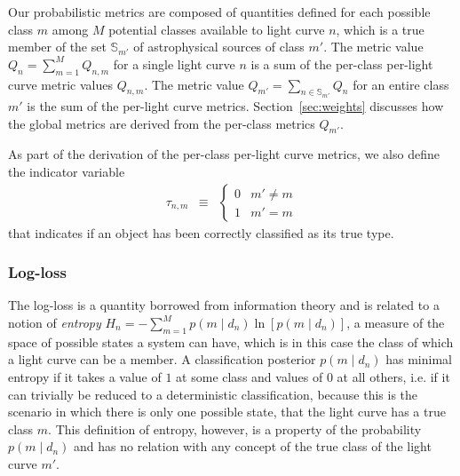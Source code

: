 Our probabilistic metrics are composed of quantities defined for each possible class $m$ among $M$ potential classes available to light curve $n$, which is a true member of the set $\mathbb{S}_{m'}$ of astrophysical sources of class $m'$.
The metric value $Q_{n} = \sum_{m=1}^{M} Q_{n, m}$ for a single light curve $n$ is a sum of the per-class per-light curve metric values $Q_{n, m}$.
The metric value $Q_{m'} = \sum_{n \in \mathbb{S}_{m'}} Q_{n}$ for an entire class $m'$ is the sum of the per-light curve metrics.
Section~\ref{sec:weights} discusses how the global metrics are derived from the per-class metrics $Q_{m'}$.

As part of the derivation of the per-class per-light curve metrics, we also define the indicator variable
\begin{eqnarray}
  \label{eq:indicator}
  \tau_{n, m} &\equiv& \begin{cases}
  0 & m' \neq m\\
  1 & m' = m
  \end{cases}
\end{eqnarray}
that indicates if an object has been correctly classified as its true type.

\subsubsection{Log-loss}
\label{sec:logloss}

The log-loss is a quantity borrowed from information theory and is related to a notion of \textit{entropy} $H_{n} = - \sum_{m=1}^{M} p(m \mid d_{n}) \ln[p(m \mid d_{n})]$, a measure of the space of possible states a system can have, which is in this case the class of which a light curve can be a member.
A classification posterior $p(m \mid d_{n})$ has minimal entropy if it takes a value of $1$ at some class and values of $0$ at all others, i.e. if it can trivially be reduced to a deterministic classification, because this is the scenario in which there is only one possible state, that the light curve has a true class $m$.
This definition of entropy, however, is a property of the probability $p(m \mid d_{n})$ and has no relation with any concept of the true class of the light curve $m'$.

